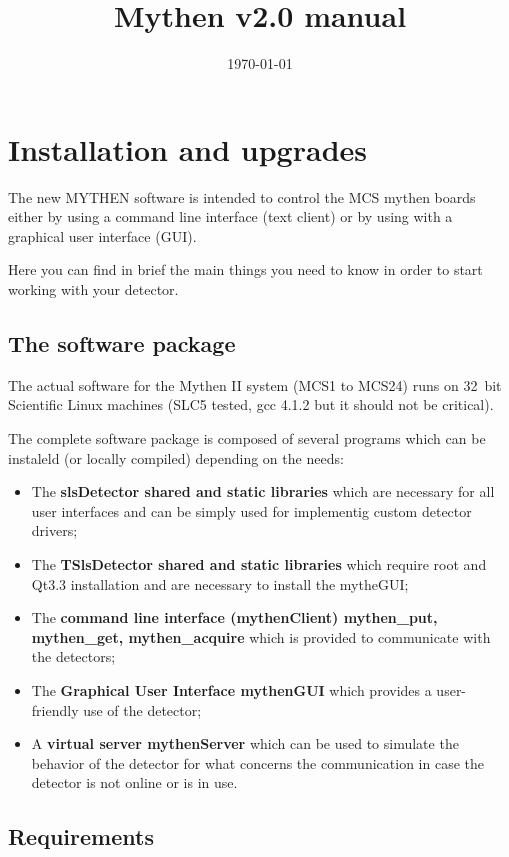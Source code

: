 \documentclass{report}
\begin{document}
\title{Mythen v2.0 manual}
\date{\today}
\maketitle


\chapter{Installation and upgrades}

The new MYTHEN software is intended to control the MCS mythen boards either by using a command line interface (text client) or by using with a graphical user interface (GUI).

Here you can find in brief the main things you need to know in order to start working with your detector. 

\section{The software package}

The actual software for the Mythen II system (MCS1 to MCS24) runs on 32~bit Scientific Linux machines (SLC5 tested, gcc 4.1.2 but it should not be critical). 

The complete software package is composed of several programs which can be instaleld (or locally compiled) depending on the needs:
\begin{itemize}
\item The \textbf{slsDetector shared and static libraries} which are necessary for all user interfaces and can be simply used for implementig custom detector drivers;
\item  The \textbf{TSlsDetector shared and static libraries} which require root and Qt3.3 installation and are necessary to install the mytheGUI;  
\item The \textbf{command line interface (mythenClient) mythen\_put, mythen\_get, mythen\_acquire} which is provided to communicate with the detectors;
\item The \textbf{Graphical User Interface mythenGUI} which provides a user-friendly use of the detector;
\item A \textbf{virtual server mythenServer} which can be used to simulate the behavior of the detector for what concerns the communication in case the detector is not online or is in use.
\end{itemize}



\section{Requirements}
\end{document}
